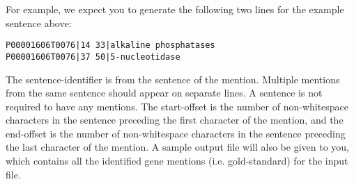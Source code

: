 For example, we expect you to generate the following two lines for the example
sentence above:

\begin{verbatim}
P00001606T0076|14 33|alkaline phosphatases
P00001606T0076|37 50|5-nucleotidase
\end{verbatim}

The sentence-identifier is from the sentence of the mention. Multiple mentions
from the same sentence should appear on separate lines. A sentence is not
required to have any mentions. The start-offset is the number of non-whitespace
characters in the sentence preceding the first character of the mention, and the
end-offset is the number of non-whitespace characters in the sentence preceding
the last character of the mention. A sample output file will also be given to
you, which contains all the identified gene mentions (i.e. gold-standard) for
the input file.
